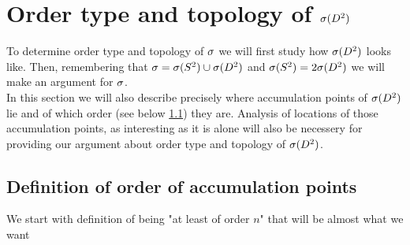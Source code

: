 \section{Order type and topology of ${{\sigma}(D^2)}$}
To determine order type and topology of ${\sigma}$ we will first study how ${{\sigma}(D^2)}$ looks like. 
Then, remembering that 
${\sigma} = {{\sigma}(S^2)} \cup {{\sigma}(D^2)}$ and ${{\sigma}(S^2)} = 2{{\sigma}(D^2)}$ we will make an argument for ${\sigma}$. \\
In this section we will also describe precisely where accumulation points of ${{\sigma}(D^2)}$ lie and of 
 which order 
(see below \ref{accumulation_points_definitions}) they are. Analysis of locations of those 
accumulation points, as interesting as it is alone will also be necessery for providing 
our argument about order type and topology of ${{\sigma}(D^2)}$. \\
\subsection{Definition of order of accumulation points}
\label{accumulation_points_definitions} 
We start with definition of being "at least of order $n$" that will be almost what we want
